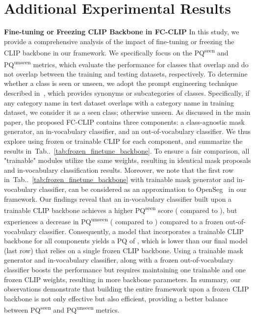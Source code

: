\documentclass{article}
\makeatletter
\DeclareRobustCommand\onedot{\futurelet\@let@token\@onedot}
\def\@onedot{\ifx\@let@token.\else.\null\fi\xspace}
\newcommand{\tabref}[1]{Tab\onedot~\ref{#1}}
\newcommand{\modelname}{FC-CLIP\xspace}
\makeatother
\begin{document}
\section{Additional Experimental Results}
\noindent \textbf{Fine-tuning or Freezing CLIP Backbone in \modelname}\quad
In this study, we provide a comprehensive analysis of the impact of fine-tuning or freezing the CLIP backbone in our framework. We specifically focus on the PQ\textsuperscript{seen} and PQ\textsuperscript{unseen} metrics, which evaluate the performance for classes that overlap and do not overlap between the training and testing datasets, respectively.
To determine whether a class is seen or unseen, we adopt the prompt engineering technique described in~\cite{ghiasi2022scaling}, which provides synonyms or
subcategories of classes. Specifically, if any category name in test dataset overlaps with a category name in training dataset, we consider it as a seen class; otherwise unseen.
As discussed in the main paper, the proposed \modelname contains three components: a class-agnostic mask generator, an in-vocabulary classifier, and an out-of-vocabulary classifier.
We thus explore using frozen or trainable CLIP for each component, and summarize the results in~\tabref{tab:frozen_finetune_backbone}.
To ensure a fair comparison, all "trainable" modules utilize the same weights, resulting in identical mask proposals and in-vocabulary classification results.
Moreover, we note that the first row in~\tabref{tab:frozen_finetune_backbone} with trainable mask generator and in-vocabulary classifier, can be considered as an approximation to OpenSeg~\cite{ghiasi2022scaling} in our framework.
Our findings reveal that an in-vocabulary classifier built upon a trainable CLIP backbone achieves a higher PQ\textsuperscript{seen} score ( compared to ), but experiences a decrease in PQ\textsuperscript{unseen} ( compared to ) compared to a frozen out-of-vocabulary classifier.
Consequently, a model that incorporates a trainable CLIP backbone for all components yields a PQ of , which is  lower than our final model (last row) that relies on a single frozen CLIP backbone.
Using a trainable mask generator and in-vocabulary classifier, along with a frozen out-of-vocabulary classifier boosts the performance but requires maintaining one trainable and one frozen CLIP weights, resulting in  more backbone parameters.
In summary, our observations demonstrate that building the entire framework upon a frozen CLIP backbone is not only effective but also efficient, providing a better balance between PQ\textsuperscript{seen} and PQ\textsuperscript{unseen} metrics.
\end{document}
